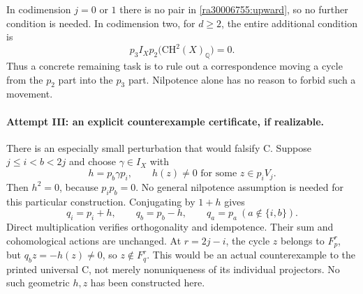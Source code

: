 \documentclass[11pt]{article}
\newcommand{\Q}{\mathbb{Q}}
\begin{document}
In codimension $j=0$ or $1$ there is no pair in
\eqref{ra30006755:upward}, so no further condition is needed.  In codimension two,
for $d\geq2$, the entire additional condition is
\begin{equation}\label{ra30006755:codim-two}
 p_3 I_X p_2\bigl(\mathrm{CH}^2(X)_{\Q}\bigr)=0.
\end{equation}
Thus a concrete remaining task is to rule out a correspondence moving a cycle
from the $p_2$ part into the $p_3$ part.  Nilpotence alone has no reason to
forbid such a movement.

\paragraph{Attempt III: an explicit counterexample certificate, if realizable.}
There is an especially small perturbation that would falsify C.  Suppose
$j\leq i<b<2j$ and choose $\gamma\in I_X$ with
\[
 h=p_b\gamma p_i,
 \qquad h(z)\ne0\text{ for some }z\in p_iV_j.
\]
Then $h^2=0$, because $p_i p_b=0$.  No general nilpotence assumption is
needed for this particular construction.  Conjugating by $1+h$ gives
\begin{equation}\label{ra30006755:elementary-perturbation}
 q_i=p_i+h,\qquad q_b=p_b-h,\qquad q_a=p_a\ (a\notin\{i,b\}).
\end{equation}
Direct multiplication verifies orthogonality and idempotence.  Their sum and
cohomological actions are unchanged.  At $r=2j-i$, the cycle $z$ belongs to
$F_p^r$, but $q_bz=-h(z)\ne0$, so $z\notin F_q^r$.  This would be an actual
counterexample to the printed universal C, not merely nonuniqueness of its
individual projectors.  No such geometric $h,z$ has been constructed here.
\end{document}
